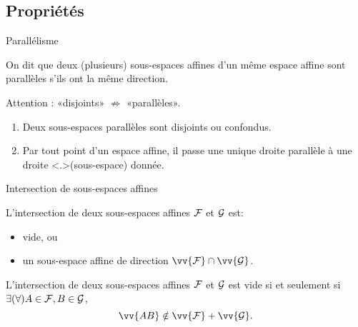 \documentclass[
bigger]{m53beamer}
\begin{document}
\subsection{Propriétés}
  \begin{frame}{Parallélisme}
    \begin{definition}
      On dit que deux (plusieurs) sous-espaces affines d'un même espace affine sont
      \alert{parallèles} s'ils ont la même direction.\pause{}
    \end{definition}\pause
    Attention : «disjoints» $\not\Rightarrow$ «parallèles».\pause
    \begin{proposition}
      \begin{enumerate}[<+->]
        \item Deux sous-espaces parallèles sont disjoints ou confondus.
        \item Par tout point d'un espace affine, il passe une unique droite \uncover<+>{(sous-espace)} parallèle à une droite  donnée.
      \end{enumerate}
    \end{proposition}
  \end{frame}
  \begin{frame}{Intersection de sous-espaces affines}
    \begin{proposition}
      L'intersection de deux sous-espaces affines $\mathcal{F}$ et $\mathcal{G}$ est:
      \begin{itemize}\pause
          \item vide\pause, ou
          \item un sous-espace affine de direction $\vv{\ens{F}}\cap\vv{\ens{G}}$.
        \end{itemize}
    \end{proposition}\pause
    \begin{proposition}
      L'intersection de deux sous-espaces affines $\mathcal{F}$ et $\mathcal{G}$ est vide si et seulement si $\exists(\forall) A \in \mathcal{F}, B \in \mathcal{G}$,
      $$
        \vv{AB} \notin \vv{\ens{F}}+\vv{\ens{G}}.
      $$
    \end{proposition}
  \end{frame}
\end{document}
